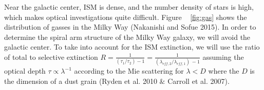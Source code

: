 \documentclass[letterpaper,11pt]{article}
\begin{document}

Near the galactic center, ISM is dense, and the number density of stars is high, which makes optical investigations quite difficult. Figure ~ \ref{fig:gas} shows the distribution of gasses in the Milky Way (Nakanishi and Sofue 2015). In order to determine the spiral arm structure of the Milky Way galaxy, we will avoid the galactic center. To take into account for the ISM extinction, we will use the ratio of total to selective extinction $R = \frac{1}{(\tau_{1} / \tau_{2}) -1} = \frac{1}{(\lambda_{eff,2} / \lambda_{eff,1}) \, -1}$ assuming the optical depth $\tau \propto \lambda^{-1}$ according to the Mie scattering for $\lambda < D$ where the $D$ is the dimension of a dust grain (Ryden et al. 2010 $\&$ Carroll et al. 2007). 
\end{document}
